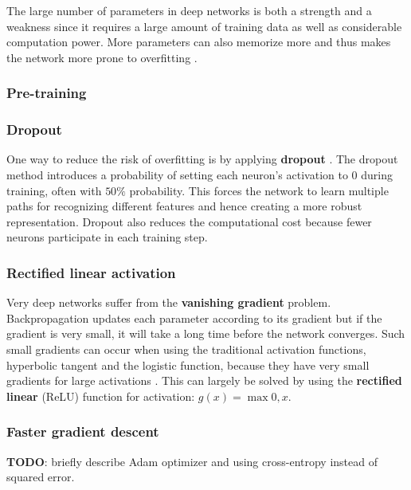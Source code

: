 The large number of parameters in deep networks is both a strength and a weakness since it requires a large amount of training data as well as considerable computation power. More parameters can also memorize more and thus makes the network more prone to overfitting \cite{AlexNet}.

\subsubsection{Pre-training}


\subsubsection{Dropout}

One way to reduce the risk of overfitting is by applying \textbf{dropout}  \cite{AlexNet, FornesCnnCategorization}.
The dropout method introduces a probability of setting each neuron's activation to $0$ during training, often with $50\%$ probability. This forces the network to learn multiple paths for recognizing different features and hence creating a more robust representation. Dropout also reduces the computational cost because fewer neurons participate in each training step.

\subsubsection{Rectified linear activation}

Very deep networks suffer from the \textbf{vanishing gradient} problem.
Backpropagation updates each parameter according to its gradient but if the gradient is very small, it will take a long time before the network converges.
Such small gradients can occur when using the traditional activation functions, hyperbolic tangent and the logistic function, because they have very small gradients for large activations \cite{AlexNet}.
This can largely be solved by using the \textbf{rectified linear} (ReLU) function for activation: $g(x) = \max{0, x}$.

\subsubsection{Faster gradient descent}
\textbf{TODO}: briefly describe Adam optimizer and using cross-entropy instead of squared error.

